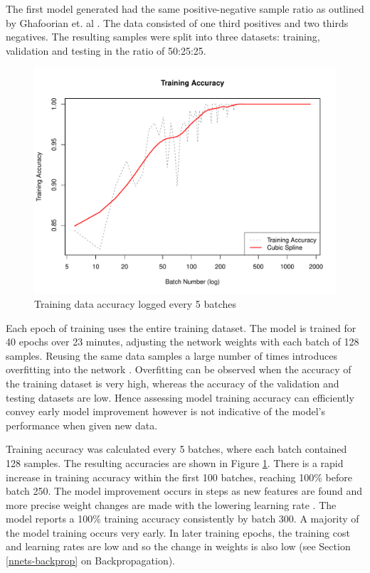 The first model generated had the same positive-negative sample ratio as outlined by Ghafoorian et. al \cite{GhafoorianM.2017Dml3}. The data consisted of one third positives and two thirds negatives. The resulting samples were split into three datasets: training, validation and testing in the ratio of 50:25:25.

\begin{figure}[b]
	\centering
	\includegraphics[width=\textwidth]{Images/7_train_acc4.pdf}
	\caption{Training data accuracy logged every 5 batches}
	\label{results-train-acc4-fig}
\end{figure}

Each epoch of training uses the entire training dataset. The model is trained for 40 epochs over 23 minutes, adjusting the network weights with each batch of 128 samples. Reusing the same data samples a large number of times introduces overfitting into the network \cite{Goodfellow-et-al-2016}. Overfitting can be observed when the accuracy of the training dataset is very high, whereas the accuracy of the validation and testing datasets are low. Hence assessing model training accuracy can efficiently convey early model improvement however is not indicative of the model's performance when given new data.

Training accuracy was calculated every 5 batches, where each batch contained 128 samples. The resulting accuracies are shown in Figure \ref{results-train-acc4-fig}. There is a rapid increase in training accuracy within the first 100 batches, reaching 100\% before batch 250. The model improvement occurs in steps as new features are found and more precise weight changes are made with the lowering learning rate \cite{Folly2009, Nielson2015}. The model reports a 100\% training accuracy consistently by batch 300. A majority of the model training occurs very early. In later training epochs, the training cost and learning rates are low and so the change in weights is also low (see Section \ref{nnets-backprop} on Backpropagation).

